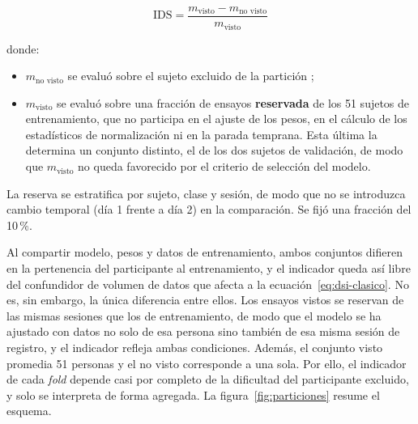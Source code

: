 \begin{equation}
\mathrm{IDS} = \frac{m_{\text{visto}} - m_{\text{no visto}}}{m_{\text{visto}}}
\label{eq:dsi}
\end{equation}

donde:

\begin{itemize}
  \item $m_{\text{no visto}}$ se evaluó sobre el sujeto excluido de la partición
        \loso{};
  \item $m_{\text{visto}}$ se evaluó sobre una fracción de ensayos
        \textbf{reservada} de los 51 sujetos de entrenamiento, que no participa
        en el ajuste de los pesos, en el cálculo de los estadísticos de
        normalización ni en la parada temprana. Esta última la determina un conjunto
        distinto, el de los dos sujetos de validación, de modo que $m_{\text{visto}}$
        no queda favorecido por el criterio de selección del modelo.
\end{itemize}

La reserva se estratifica por sujeto, clase y sesión, de modo que no se
introduzca cambio temporal (día 1 frente a día 2) en la comparación. Se fijó una
fracción del 10\,\%.

Al compartir modelo, pesos y datos de entrenamiento, ambos conjuntos difieren en la
pertenencia del participante al entrenamiento, y el indicador queda así libre del
confundidor de volumen de datos que afecta a la ecuación~\eqref{eq:dsi-clasico}. No es, sin
embargo, la única diferencia entre ellos. Los ensayos vistos se reservan de las mismas
sesiones que los de entrenamiento, de modo que el modelo se ha ajustado con datos no solo
de esa persona sino también de esa misma sesión de registro, y el indicador refleja ambas
condiciones. Además, el conjunto visto promedia 51 personas y el no visto corresponde a una sola.
Por ello, el indicador de cada \textit{fold} depende casi por completo de la dificultad
del participante excluido, y solo se interpreta de forma agregada. La figura~\ref{fig:particiones} resume el
esquema.

